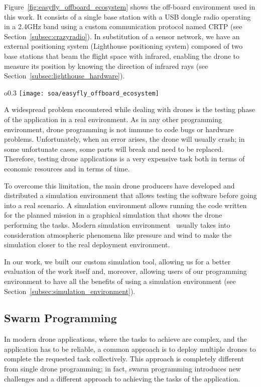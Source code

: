 Figure~\ref{fig:easyfly_offboard_ecosystem} shows the off-board environment used in this work. 
It consists of a single base station with a USB dongle radio operating in a 2.4GHz band using a custom communication protocol named CRTP (see Section~\ref{subsec:crazyradio}). 
In substitution of a sensor network, we have an external positioning system (Lighthouse positioning system) composed of two base stations that beam the flight space with infrared, enabling the drone to measure its position by knowing the direction of infrared rays (see Section~\ref{subsec:lighthouse_hardware}).

\begin{wrapfigure}{o}{0.3\textwidth}
    \texttt{[image: soa/easyfly\_offboard\_ecosystem]}
    \caption{EasyFly off-board ecosystem.}\label{fig:easyfly_offboard_ecosystem}
\end{wrapfigure}

A widespread problem encountered while dealing with drones is the testing phase of the application in a real environment. 
As in any other programming environment, drone programming is not immune to code bugs or hardware problems. 
Unfortunately, when an error arises, the drone will usually crash; in some unfortunate cases, some parts will break and need to be replaced. 
Therefore, testing drone applications is a very expensive task both in terms of economic resources and in terms of time. 

To overcome this limitation, the main drone producers have developed and distributed a simulation environment that allows 
testing the software before going into a real scenario. 
A simulation environment allows running the code written for the planned mission in a graphical simulation that shows the drone performing the tasks. 
Modern simulation environment~\cite{sphinx, DIJflightSimulator} usually takes into consideration atmospheric phenomena like pressure and wind to make the simulation 
closer to the real deployment environment.

In our work, we built our custom simulation tool, allowing us for a better evaluation of the work itself and, moreover, allowing  
users of our programming environment to have all the benefits of using a simulation environment (see Section~\ref{subsec:simulation_environment}).

\subsection{Swarm Programming}\label{subsec:swarm_programming}
In modern drone applications, where the tasks to achieve are complex, and the application has to be reliable, a common approach is 
to deploy multiple drones to complete the requested task collectively. This approach is completely different from single 
drone programming; in fact, swarm programming introduces new challenges and a different approach to achieving the tasks of the application.

